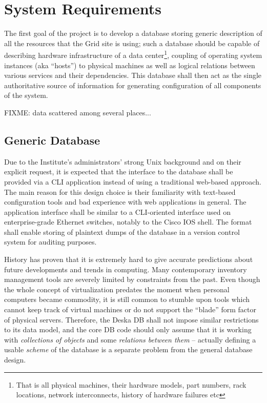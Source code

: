 \documentclass{article}
\begin{document}
\section{System Requirements}

The first goal of the project is to develop a database storing generic description of all the resources that the Grid
site is using; such a database should be capable of describing hardware infrastructure of a data center\footnote{That is all
physical machines, their hardware models, part numbers, rack locations, network interconnects, history of hardware failures etc},
coupling of operating system instances (aka ``hosts'') to physical machines as well as logical relations between various
services and their dependencies.  This database shall then act as the single authoritative source
of information for generating configuration of all components of the system.

FIXME: data scattered among several places... 

\subsection{Generic Database}

Due to the Institute's administrators' strong Unix background and on their explicit request, it is expected that the interface to
the database shall be provided via a CLI application instead of using a traditional web-based approach.  The main reason for this
design choice is their familiarity with text-based configuration tools and bad experience with web applications in general.  The
application interface shall be similar to a CLI-oriented interface used on enterprise-grade Ethernet switches, notably to the
Cisco IOS shell.  The format shall enable storing of plaintext dumps of the database in a version control system for auditing
purposes.

History has proven that it is extremely hard to give accurate predictions about future developments and trends in computing.  Many
contemporary inventory management tools are severely limited by constraints from the past.  Even though the whole concept of
virtualization predates the moment when personal computers became commodity, it is still common to stumble upon tools which cannot
keep track of virtual machines or do not support the ``blade'' form factor of physical servers.  Therefore, the Deska DB shall not
impose similar restrictions to its data model, and the core DB code should only assume that it is working with {\em collections of
objects} and some {\em relations between them} -- actually defining a usable {\em scheme} of the database is a separate problem
from the general database design.
\end{document}
